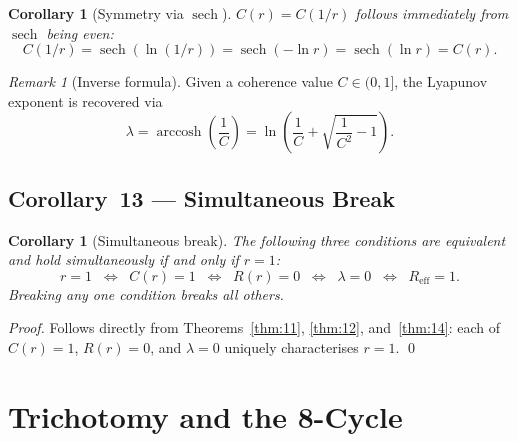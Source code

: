 \documentclass[12pt,a4paper]{article}
\theoremstyle{plain}
\newtheorem{corollary}[theorem]{Corollary}
\theoremstyle{definition}
\theoremstyle{remark}
\newtheorem{remark}[theorem]{Remark}
\newcommand{\Reff}{R_{\mathrm{eff}}}
\begin{document}
\begin{corollary}[Symmetry via $\operatorname{sech}$]\label{cor:sech-sym}
  $C(r) = C(1/r)$ follows immediately from $\operatorname{sech}$ being even:
  \[
    C(1/r) = \operatorname{sech}(\ln(1/r))
           = \operatorname{sech}(-\ln r)
           = \operatorname{sech}(\ln r)
           = C(r).
  \]
\end{corollary}

\begin{remark}[Inverse formula]
  Given a coherence value $C\in(0,1]$, the Lyapunov exponent is recovered via
  \begin{equation}
    \lambda = \operatorname{arccosh}\!\left(\frac{1}{C}\right)
            = \ln\!\left(\frac{1}{C} + \sqrt{\frac{1}{C^2}-1}\right).
    \label{eq:lambda-from-C}
  \end{equation}
\end{remark}

\subsection{Corollary~13 — Simultaneous Break}

\begin{corollary}[Simultaneous break]\label{cor:13}
  The following three conditions are equivalent and hold simultaneously
  if and only if $r = 1$:
  \begin{equation}
    r = 1
    \;\;\Longleftrightarrow\;\;
    C(r) = 1
    \;\;\Longleftrightarrow\;\;
    R(r) = 0
    \;\;\Longleftrightarrow\;\;
    \lambda = 0
    \;\;\Longleftrightarrow\;\;
    \Reff = 1.
    \label{eq:simultaneous}
  \end{equation}
  Breaking any one condition breaks all others.
\end{corollary}

\begin{proof}
  Follows directly from Theorems~\ref{thm:11}, \ref{thm:12}, and~\ref{thm:14}:
  each of $C(r)=1$, $R(r)=0$, and $\lambda=0$ uniquely characterises $r=1$. \qed
\end{proof}

\section{Trichotomy and the 8-Cycle}
\label{sec:trichotomy}
\end{document}
